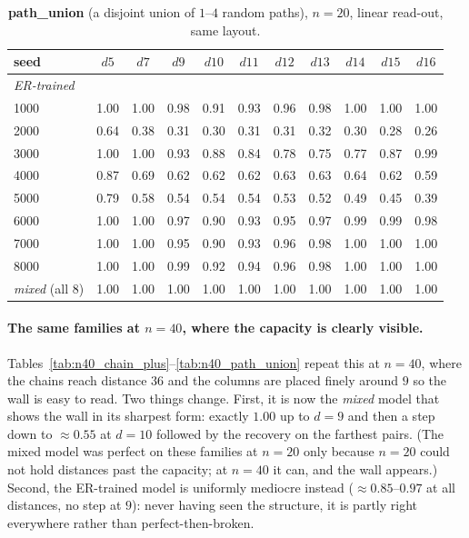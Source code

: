 \documentclass[11pt,a4paper]{article}
\begin{document}
\begin{table}[H]\centering\small
\begin{tabular}{lcccccccccc}
\toprule
seed & $d5$ & $d7$ & $d9$ & $d10$ & $d11$ & $d12$ & $d13$ & $d14$ & $d15$ & $d16$ \\
\midrule
\multicolumn{11}{l}{\emph{ER-trained}}\\
1000 & 1.00 & 1.00 & 0.98 & 0.91 & 0.93 & 0.96 & 0.98 & 1.00 & 1.00 & 1.00 \\
2000 & 0.64 & 0.38 & 0.31 & 0.30 & 0.31 & 0.31 & 0.32 & 0.30 & 0.28 & 0.26 \\
3000 & 1.00 & 1.00 & 0.93 & 0.88 & 0.84 & 0.78 & 0.75 & 0.77 & 0.87 & 0.99 \\
4000 & 0.87 & 0.69 & 0.62 & 0.62 & 0.62 & 0.63 & 0.63 & 0.64 & 0.62 & 0.59 \\
5000 & 0.79 & 0.58 & 0.54 & 0.54 & 0.54 & 0.53 & 0.52 & 0.49 & 0.45 & 0.39 \\
6000 & 1.00 & 1.00 & 0.97 & 0.90 & 0.93 & 0.95 & 0.97 & 0.99 & 0.99 & 0.98 \\
7000 & 1.00 & 1.00 & 0.95 & 0.90 & 0.93 & 0.96 & 0.98 & 1.00 & 1.00 & 1.00 \\
8000 & 1.00 & 1.00 & 0.99 & 0.92 & 0.94 & 0.96 & 0.98 & 1.00 & 1.00 & 1.00 \\
\midrule
\emph{mixed} (all 8) & 1.00 & 1.00 & 1.00 & 1.00 & 1.00 & 1.00 & 1.00 & 1.00 & 1.00 & 1.00 \\
\bottomrule\end{tabular}
\caption{\textbf{path\_union} (a disjoint union of $1$--$4$ random paths), $n=20$, linear read-out, same layout.}
\label{tab:dist_path_union}
\end{table}

\paragraph{The same families at $n=40$, where the capacity is clearly visible.}
Tables~\ref{tab:n40_chain_plus}--\ref{tab:n40_path_union} repeat this at $n=40$, where the
chains reach distance $36$ and the columns are placed finely around $9$ so the wall is easy to
read. Two things change. First, it is now the \emph{mixed} model that shows the wall in its
sharpest form: exactly $1.00$ up to $d=9$ and then a step down to $\approx0.55$ at $d=10$ followed by the recovery on the farthest pairs.
(The mixed model was perfect on these families at $n=20$ only because $n=20$ could not hold
distances past the capacity; at $n=40$ it can, and the wall appears.) Second, the ER-trained
model is uniformly mediocre instead ($\approx0.85$--$0.97$ at all distances, no step at $9$):
never having seen the structure, it is partly right everywhere rather than perfect-then-broken.
\end{document}
